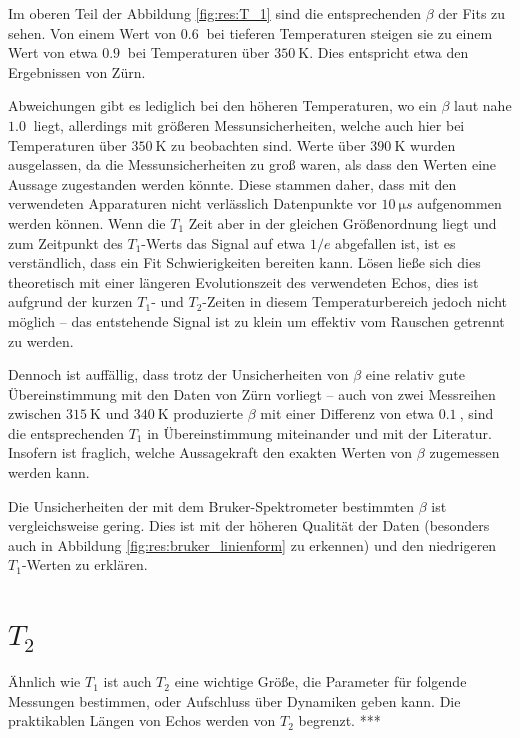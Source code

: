 Im oberen Teil der Abbildung \ref{fig:res:T_1} sind die entsprechenden $\beta$ der Fits zu sehen. Von einem Wert von $\SI{0.6}{}$ bei tieferen Temperaturen steigen sie zu einem Wert von etwa $\SI{0.9}{}$ bei Temperaturen über $\SI{350}{\kelvin}$. Dies entspricht etwa den Ergebnissen von Zürn.

Abweichungen gibt es lediglich bei den höheren Temperaturen, wo ein $\beta$ laut \cite{zuern_paper} nahe $\SI{1.0}{}$ liegt, allerdings mit größeren Messunsicherheiten, welche auch hier bei Temperaturen über $\SI{350}{\kelvin}$ zu beobachten sind. Werte über $\SI{390}{\kelvin}$ wurden ausgelassen, da die Messunsicherheiten zu groß waren, als dass den Werten eine Aussage zugestanden werden könnte. Diese stammen daher, dass mit den verwendeten Apparaturen nicht verlässlich Datenpunkte vor $\SI{10}{\micro s}$ aufgenommen werden können. Wenn die $T_1$ Zeit aber in der gleichen Größenordnung liegt und zum Zeitpunkt des $T_1$-Werts das Signal auf etwa $1/e$ abgefallen ist, ist es verständlich, dass ein Fit Schwierigkeiten bereiten kann. Lösen ließe sich dies theoretisch mit einer längeren Evolutionszeit des verwendeten Echos, dies ist aufgrund der kurzen $T_1$- und $T_2$-Zeiten in diesem Temperaturbereich jedoch nicht möglich -- das entstehende Signal ist zu klein um effektiv vom Rauschen getrennt zu werden.

Dennoch ist auffällig, dass trotz der Unsicherheiten von $\beta$ eine relativ gute Übereinstimmung mit den Daten von Zürn vorliegt -- auch von zwei Messreihen zwischen $\SI{315}{\kelvin}$ und $\SI{340}{\kelvin}$ produzierte $\beta$ mit einer Differenz von etwa $\SI{0.1}{}$, sind die entsprechenden $T_1$ in Übereinstimmung miteinander und mit der Literatur. Insofern ist fraglich, welche Aussagekraft den exakten Werten von $\beta$ zugemessen werden kann.

Die Unsicherheiten der mit dem Bruker-Spektrometer bestimmten $\beta$ ist vergleichsweise gering. Dies ist mit der höheren Qualität der Daten (besonders auch in Abbildung \ref{fig:res:bruker_linienform} zu erkennen) und den niedrigeren $T_1$-Werten zu erklären.



\section{$T_2$} \label{section:res:T_2}

Ähnlich wie $T_1$ ist auch $T_2$ eine wichtige Größe, die Parameter für folgende Messungen bestimmen, oder Aufschluss über Dynamiken geben kann. Die praktikablen Längen von Echos werden von $T_2$ begrenzt. ***

